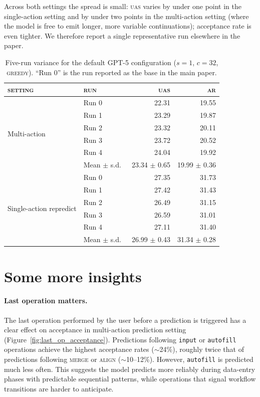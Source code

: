 \documentclass{article}
\newcommand{\op}[1]{\texttt{\small #1}}
\theoremstyle{plain}
\theoremstyle{definition}
\theoremstyle{remark}
\begin{document}
Across both settings the spread is small: \textsc{uas} varies by under one point in the
single-action setting and by under two points in the multi-action setting (where the model
is free to emit longer, more variable continuations); acceptance rate is even tighter.
We therefore report a single representative run elsewhere in the paper.

\begin{table}[h]
  \caption{Five-run variance for the default GPT-5 configuration ($s{=}1$,
  $c{=}32$, \textsc{greedy}). ``Run 0'' is the run reported as the base in the main paper.}
  \label{tab:variance}
  \centering
  \small
  \begin{tabular}{llrr}
    \toprule
    \textsc{setting} & \textsc{run} & \textsc{uas} & \textsc{ar} \\
    \midrule
    \multirow{6}{*}{Multi-action}
      & Run 0   & 22.31 & 19.55 \\
      & Run 1  & 23.29 & 19.87 \\
      & Run 2  & 23.32 & 20.11 \\
      & Run 3  & 23.72 & 20.52 \\
      & Run 4  & 24.04 & 19.92 \\
      \cmidrule(lr){2-4}
      & Mean $\pm$ s.d.\ & 23.34 $\pm$ 0.65 & 19.99 $\pm$ 0.36 \\
    \midrule
    \multirow{6}{*}{Single-action repredict}
      & Run 0   & 27.35 & 31.73 \\
      & Run 1  & 27.42 & 31.43 \\
      & Run 2  & 26.49 & 31.15 \\
      & Run 3  & 26.59 & 31.01 \\
      & Run 4  & 27.11 & 31.40 \\
      \cmidrule(lr){2-4}
      & Mean $\pm$ s.d.\ & 26.99 $\pm$ 0.43 & 31.34 $\pm$ 0.28 \\
    \bottomrule
  \end{tabular}
\end{table}


\section{Some more insights}

\paragraph{Last operation matters.}
The last operation performed by the user before a prediction is triggered has a clear effect on acceptance in multi-action prediction setting (Figure~\ref{fig:last_op_acceptance}).
Predictions following \op{input} or \op{autofill} operations achieve the highest acceptance rates ($\sim$24\%), roughly twice that of predictions following \textsc{merge} or \textsc{align} ($\sim$10--12\%). However, \op{autofill} is predicted much less often.
This suggests the model predicts more reliably during data-entry phases with predictable sequential patterns, while operations that signal workflow transitions are harder to anticipate.
\end{document}
